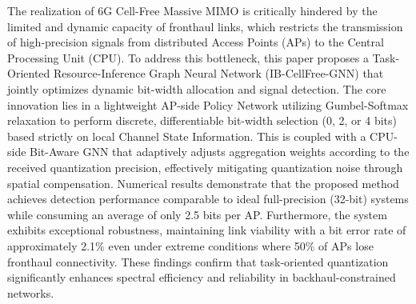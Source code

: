 The realization of 6G Cell-Free Massive MIMO is critically hindered by the limited and dynamic capacity of fronthaul links, which restricts the transmission of high-precision signals from distributed Access Points (APs) to the Central Processing Unit (CPU). To address this bottleneck, this paper proposes a Task-Oriented Resource-Inference Graph Neural Network (IB-CellFree-GNN) that jointly optimizes dynamic bit-width allocation and signal detection. The core innovation lies in a lightweight AP-side Policy Network utilizing Gumbel-Softmax relaxation to perform discrete, differentiable bit-width selection (0, 2, or 4 bits) based strictly on local Channel State Information. This is coupled with a CPU-side Bit-Aware GNN that adaptively adjusts aggregation weights according to the received quantization precision, effectively mitigating quantization noise through spatial compensation. Numerical results demonstrate that the proposed method achieves detection performance comparable to ideal full-precision (32-bit) systems while consuming an average of only 2.5 bits per AP. Furthermore, the system exhibits exceptional robustness, maintaining link viability with a bit error rate of approximately 2.1\% even under extreme conditions where 50\% of APs lose fronthaul connectivity. These findings confirm that task-oriented quantization significantly enhances spectral efficiency and reliability in backhaul-constrained networks.